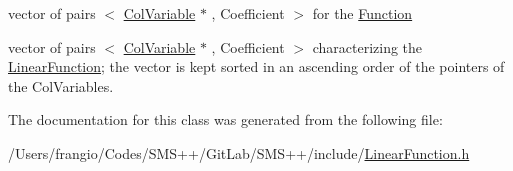 vector of pairs $<$ \mbox{\hyperlink{class_s_m_spp__di__unipi__it_1_1_col_variable}{Col\+Variable}} $\ast$ , Coefficient $>$ for the \mbox{\hyperlink{class_s_m_spp__di__unipi__it_1_1_function}{Function}} 

vector of pairs $<$ \mbox{\hyperlink{class_s_m_spp__di__unipi__it_1_1_col_variable}{Col\+Variable}} $\ast$ , Coefficient $>$ characterizing the \mbox{\hyperlink{class_s_m_spp__di__unipi__it_1_1_linear_function}{Linear\+Function}}; the vector is kept sorted in an ascending order of the pointers of the Col\+Variables. 

The documentation for this class was generated from the following file\+:\begin{DoxyCompactItemize}
\item 
/\+Users/frangio/\+Codes/\+S\+M\+S++/\+Git\+Lab/\+S\+M\+S++/include/\mbox{\hyperlink{_linear_function_8h}{Linear\+Function.\+h}}\end{DoxyCompactItemize}
